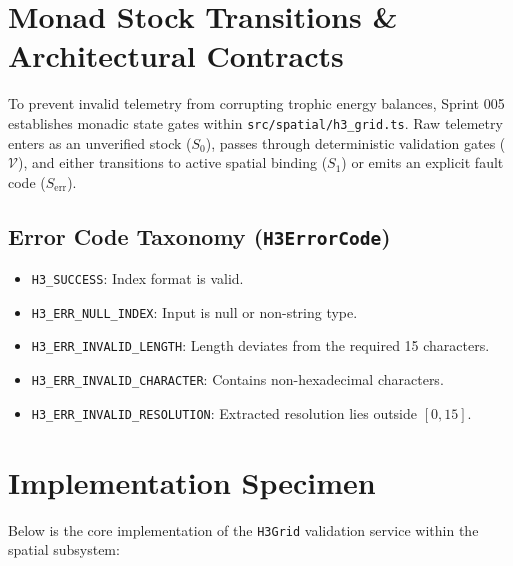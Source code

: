 \documentclass[11pt, a4paper]{article}
\begin{document}
\section{Monad Stock Transitions \& Architectural Contracts}
To prevent invalid telemetry from corrupting trophic energy balances, Sprint 005 establishes monadic state gates within \texttt{src/spatial/h3\_grid.ts}. Raw telemetry enters as an unverified stock ($S_0$), passes through deterministic validation gates ($\mathcal{V}$), and either transitions to active spatial binding ($S_1$) or emits an explicit fault code ($S_{\text{err}}$).

\subsection*{Error Code Taxonomy (\texttt{H3ErrorCode})}
\begin{itemize}
    \item \texttt{H3\_SUCCESS}: Index format is valid.
    \item \texttt{H3\_ERR\_NULL\_INDEX}: Input is null or non-string type.
    \item \texttt{H3\_ERR\_INVALID\_LENGTH}: Length deviates from the required 15 characters.
    \item \texttt{H3\_ERR\_INVALID\_CHARACTER}: Contains non-hexadecimal characters.
    \item \texttt{H3\_ERR\_INVALID\_RESOLUTION}: Extracted resolution lies outside $[0, 15]$.
\end{itemize}

\section{Implementation Specimen}
Below is the core implementation of the \texttt{H3Grid} validation service within the spatial subsystem:
\end{document}
